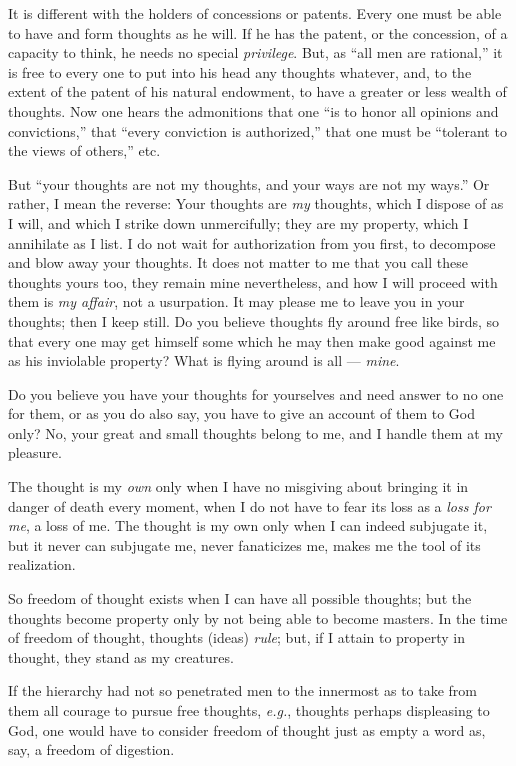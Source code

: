 It is different with the holders of concessions or patents. Every one must be 
able to have and form thoughts as he will. If he has the patent, or the 
concession, of a capacity to think, he needs no special \textit{privilege}. 
But, as ``all men are rational,'' it is free to every one to put into his 
head any thoughts whatever, and, to the extent of the patent of his natural 
endowment, to have a greater or less wealth of thoughts. Now one hears the 
admonitions that one ``is to honor all opinions and convictions,'' that 
``every conviction is authorized,'' that one must be ``tolerant to the 
views of others,'' etc.

But ``your thoughts are not my thoughts, and your ways are not my ways.'' Or 
rather, I mean the reverse: Your thoughts are \textit{my} thoughts, which I 
dispose of as I will, and which I strike down unmercifully; they are my 
property, which I annihilate as I list. I do not wait for authorization from 
you first, to decompose and blow away your thoughts. It does not matter to me 
that you call these thoughts yours too, they remain mine nevertheless, and how 
I will proceed with them is \textit{my affair}, not a usurpation. It may 
please me to leave you in your thoughts; then I keep still. Do you believe 
thoughts fly around free like birds, so that every one may get himself some 
which he may then make good against me as his inviolable property? What is 
flying around is all --- \textit{mine}.

Do you believe you have your thoughts for yourselves and need answer to no one 
for them, or as you do also say, you have to give an account of them to God 
only? No, your great and small thoughts belong to me, and I handle them at my 
pleasure.

The thought is my \textit{own} only when I have no misgiving about bringing it 
in danger of death every moment, when I do not have to fear its loss as a 
\textit{loss for me}, a loss of me. The thought is my own only when I can 
indeed subjugate it, but it never can subjugate me, never fanaticizes me, 
makes me the tool of its realization.

So freedom of thought exists when I can have all possible thoughts; but the 
thoughts become property only by not being able to become masters. In the time 
of freedom of thought, thoughts (ideas) \textit{rule}; but, if I attain to 
property in thought, they stand as my creatures.

If the hierarchy had not so penetrated men to the innermost as to take from 
them all courage to pursue free thoughts, \textit{e.g.}, thoughts perhaps 
displeasing to God, one would have to consider freedom of thought just as 
empty a word as, say, a freedom of digestion.

